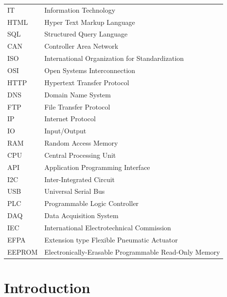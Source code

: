 \documentclass[english,12pt,a4paper,pdftex,eng,utf8]{aaltothesis}
\begin{document}
\thesistableofcontents



\begin{tabular}{ll}
  IT & Information Technology \\
  HTML & Hyper Text Markup Language \\
  SQL & Structured Query Language \\
  CAN & Controller Area Network \\
  ISO & International Organization for Standardization \\
  OSI & Open Systems Interconnection \\
  HTTP & Hypertext Transfer Protocol \\
  DNS & Domain Name System \\
  FTP & File Transfer Protocol \\
  IP & Internet Protocol \\
  IO & Input/Output \\
  RAM & Random Access Memory \\
  CPU & Central Processing Unit \\
  API & Application Programming Interface \\
  I2C & Inter-Integrated Circuit \\
  USB & Universal Serial Bus \\
  PLC & Programmable Logic Controller \\
  DAQ & Data Acquisition System \\
  IEC & International Electrotechnical Commission \\
  EFPA & Extension type Flexible Pneumatic Actuator \\
  EEPROM & Electronically-Erasable Programmable Read-Only Memory \\
\end{tabular}


\cleardoublepage
\storeinipagenumber
{}
\setcounter{page}{1}


\section{Introduction}
\end{document}
